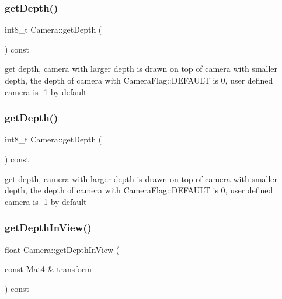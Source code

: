\subsubsection{\texorpdfstring{get\+Depth()}{getDepth()}\hspace{0.1cm}{\footnotesize\ttfamily [1/2]}}
{\footnotesize\ttfamily int8\+\_\+t Camera\+::get\+Depth (\begin{DoxyParamCaption}{ }\end{DoxyParamCaption}) const\hspace{0.3cm}{\ttfamily [inline]}}

get depth, camera with larger depth is drawn on top of camera with smaller depth, the depth of camera with Camera\+Flag\+::\+D\+E\+F\+A\+U\+LT is 0, user defined camera is -\/1 by default \mbox{\label{classCamera_afeacc2e59eb6cc6e32d55673f0c92ada}} 
\subsubsection{\texorpdfstring{get\+Depth()}{getDepth()}\hspace{0.1cm}{\footnotesize\ttfamily [2/2]}}
{\footnotesize\ttfamily int8\+\_\+t Camera\+::get\+Depth (\begin{DoxyParamCaption}{ }\end{DoxyParamCaption}) const\hspace{0.3cm}{\ttfamily [inline]}}

get depth, camera with larger depth is drawn on top of camera with smaller depth, the depth of camera with Camera\+Flag\+::\+D\+E\+F\+A\+U\+LT is 0, user defined camera is -\/1 by default \mbox{\label{classCamera_a5b38e0d536fb4773aaad12285634b227}} 
\subsubsection{\texorpdfstring{get\+Depth\+In\+View()}{getDepthInView()}\hspace{0.1cm}{\footnotesize\ttfamily [1/2]}}
{\footnotesize\ttfamily float Camera\+::get\+Depth\+In\+View (\begin{DoxyParamCaption}\item[{const \hyperlink{classMat4}{Mat4} \&}]{transform }\end{DoxyParamCaption}) const}

